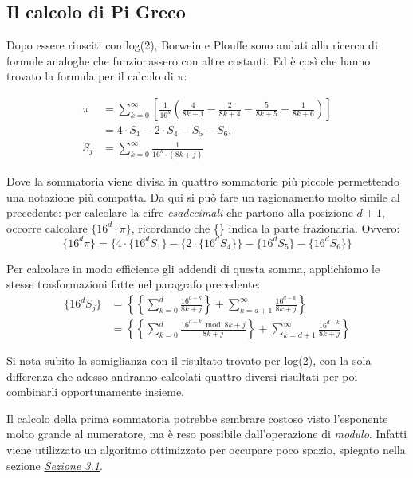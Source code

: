 \subsection{Il calcolo di Pi Greco}
Dopo essere riusciti con log(2), Borwein e Plouffe sono andati alla ricerca di formule analoghe che funzionassero con altre costanti. Ed è così che hanno trovato la formula per il calcolo di $\pi$:

\begin{equation*}
\begin{split}
\pi 
& = \sum\limits_{k=0}^{\infty} \left[ \frac{1}{16^k}\left( \frac{4}{8k+1} - \frac{2}{8k+4} - \frac{5}{8k+5} - \frac{1}{8k+6} \right) \right] \\
& =
4 \cdot S_1 - 2 \cdot S_4 - S_5 - S_6, \\
S_j & = \sum\limits_{k=0}^{\infty} \frac{1}{16^k \cdot (8k+j)}
\end{split}
\end{equation*}

Dove la sommatoria viene divisa in quattro sommatorie più piccole permettendo una notazione più compatta.
\bigbreak
Da qui si può fare un ragionamento molto simile al precedente: per calcolare la cifre \textit{esadecimali} che partono alla posizione $d+1$, occorre calcolare $\{16^d \cdot \pi\}$, ricordando che \{\} indica la parte frazionaria. Ovvero:
\begin{equation*}
\{16^d\pi\} =
\{4 \cdot \{16^dS_1\} - \{2 \cdot \{16^dS_4\}\} - \{16^dS_5\} - \{16^dS_6\}\}
\end{equation*}

Per calcolare in modo efficiente gli addendi di questa somma, applichiamo le stesse trasformazioni fatte nel paragrafo precedente:
\begin{equation*}
\begin{split}
\{16^dS_j\} & = \left\{\left\{\sum\limits_{k=0}^d \frac{16^{d-k}}{8k+j}\right\} + \sum\limits_{k=d+1}^\infty \frac{16^{d-k}}{8k+j}\right\} \\
& = \left\{\left\{\sum\limits_{k=0}^d \frac{16^{d-k}\bmod{8k+j}}{8k+j}\right\} + \sum\limits_{k=d+1}^\infty \frac{16^{d-k}}{8k+j}\right\}
\end{split}
\end{equation*}

Si nota subito la somiglianza con il risultato trovato per log(2), con la sola differenza che adesso andranno calcolati quattro diversi risultati per poi combinarli opportunamente insieme.

Il calcolo della prima sommatoria potrebbe sembrare costoso visto l'esponente molto grande al numeratore, ma è reso possibile dall'operazione di \textit{modulo}. Infatti viene utilizzato un algoritmo ottimizzato per occupare poco spazio, spiegato nella sezione \hyperref[sec:impl_pot]{\textit{Sezione 3.1}}.